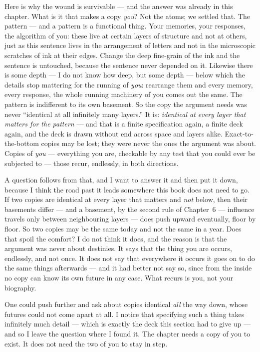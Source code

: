 \documentclass[fontsize=11pt,paper=a4,pagesize=auto,parskip=half-]{scrbook}
\begin{document}
Here is why the wound is survivable --- and the answer was already in this chapter. What is it that makes a copy \emph{you}? Not the atoms; we settled that. The pattern --- and a pattern is a functional thing. Your memories, your responses, the algorithm of you: these live at certain layers of structure and not at others, just as this sentence lives in the arrangement of letters and not in the microscopic scratches of ink at their edges. Change the deep fine-grain of the ink and the sentence is untouched, because the sentence never depended on it. Likewise there is some depth --- I do not know how deep, but some depth --- below which the details stop mattering for the running of \emph{you}: rearrange them and every memory, every response, the whole running machinery of you comes out the same. The pattern is indifferent to its own basement. So the copy the argument needs was never ``identical at all infinitely many layers.'' It is: \emph{identical at every layer that matters for the pattern} --- and that is a finite specification again, a finite deck again, and the deck is drawn without end across space and layers alike. Exact-to-the-bottom copies may be lost; they were never the ones the argument was about. Copies of \emph{you} --- everything you are, checkable by any test that you could ever be subjected to --- those recur, endlessly, in both directions.

A question follows from that, and I want to answer it and then put it down, because I think the road past it leads somewhere this book does not need to go. If two copies are identical at every layer that matters and \emph{not} below, then their basements differ --- and a basement, by the second rule of Chapter~6 --- influence travels only between neighbouring layers --- does push upward eventually, floor by floor. So two copies may be the same today and not the same in a year. Does that spoil the comfort? I do not think it does, and the reason is that the argument was never about destinies. It says that the thing you are occurs, endlessly, and not once. It does not say that everywhere it occurs it goes on to do the same things afterwards --- and it had better not say so, since from the inside no copy can know its own future in any case. What recurs is you, not your biography.

One could push further and ask about copies identical \emph{all} the way down, whose futures could not come apart at all. I notice that specifying such a thing takes infinitely much detail --- which is exactly the deck this section had to give up --- and so I leave the question where I found it. The chapter needs a copy of you to exist. It does not need the two of you to stay in step.
\end{document}
